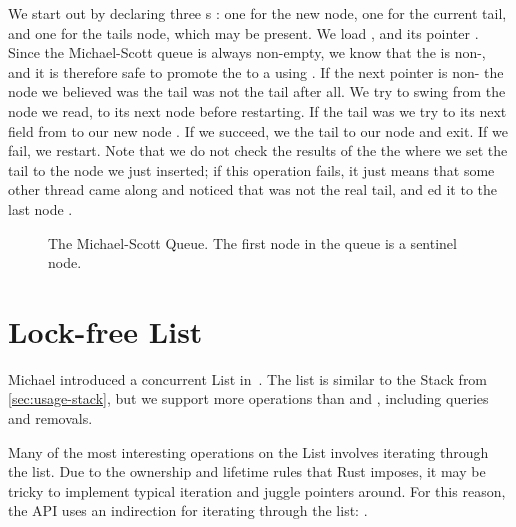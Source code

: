 We start out by declaring three s : one for the new node, one for the
current tail, and one for the tails  node, which may be present.  We load 
, and its  pointer .  Since the Michael-Scott queue is always
non-empty, we know that the  is non-, and it is therefore safe to promote the
 to a  using .  If the next pointer is non-
the node we believed was the tail was not the tail after all. We try to swing  from the
node we read, to its next node  before restarting.  If the tail was  we try
to  its next field from  to our new node . If we succeed, we
 the tail to our node and exit. If we fail, we restart.  Note that we do not check the
results of the the  where we set the tail to the node we just inserted; if this operation
fails, it just means that some other thread came along and noticed that  was not the
real tail, and ed it to the last node .


\begin{figure}[b]
\centering

\caption{The Michael-Scott Queue. The first node in the queue is a sentinel node.}
\end{figure}




\clearpage

\section{Lock-free List}

Michael introduced a concurrent List in~\cite{michael2002high}. The list is similar to the
Stack from \cref{sec:usage-stack}, but we support more operations than  and ,
including queries and removals.

Many of the most interesting operations on the List involves iterating through the list. Due to the
ownership and lifetime rules that Rust imposes, it may be tricky to implement typical iteration
and juggle pointers around. For this reason, the API uses an indirection for iterating through the
list: .

\begin{figure}[ht]

\end{figure}

